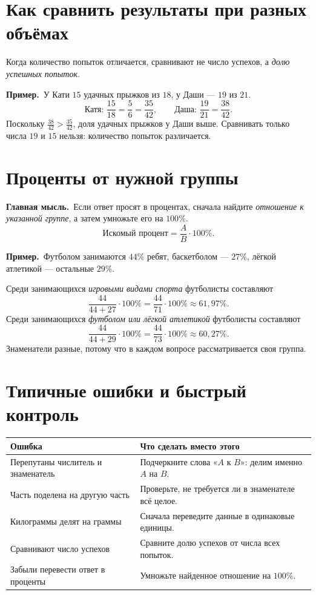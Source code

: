 \documentclass[a4paper,12pt]{article}
\newcommand{\keyidea}[1]{\textcolor{darkaccent}{\textbf{Главная мысль.}}\ #1}
\newcommand{\ex}[1]{\par\textcolor{darkaccent}{\textbf{Пример.}}\ #1}
\begin{document}
\section{Как сравнить результаты при разных объёмах}

Когда количество попыток отличается, сравнивают не число успехов, а \emph{долю успешных попыток}.

\ex{У Кати $15$ удачных прыжков из $18$, у Даши --- $19$ из $21$.}
\[
\text{Катя: }\frac{15}{18}=\frac56=\frac{35}{42},\qquad
\text{Даша: }\frac{19}{21}=\frac{38}{42}.
\]
Поскольку $\frac{38}{42}>\frac{35}{42}$, доля удачных прыжков у Даши выше. Сравнивать только числа $19$ и $15$ нельзя: количество попыток различается.

\section{Проценты от нужной группы}

\keyidea{Если ответ просят в процентах, сначала найдите \emph{отношение к указанной группе}, а затем умножьте его на $100\%$.}
\[
\boxed{\displaystyle \text{Искомый процент}=\frac{A}{B}\cdot100\%}.
\]
\ex{Футболом занимаются $44\%$ ребят, баскетболом --- $27\%$, лёгкой атлетикой --- остальные $29\%$.}

Среди занимающихся \emph{игровыми видами спорта} футболисты составляют
\[
\frac{44}{44+27}\cdot100\%=\frac{44}{71}\cdot100\%\approx61{,}97\%.
\]
Среди занимающихся \emph{футболом или лёгкой атлетикой} футболисты составляют
\[
\frac{44}{44+29}\cdot100\%=\frac{44}{73}\cdot100\%\approx60{,}27\%.
\]
Знаменатели разные, потому что в каждом вопросе рассматривается своя группа.

\section{Типичные ошибки и быстрый контроль}

\renewcommand{\arraystretch}{1.24}
\begin{tabularx}{\linewidth}{@{}p{.38\linewidth}X@{}}
\toprule
\textbf{Ошибка} & \textbf{Что сделать вместо этого}\\
\midrule
Перепутаны числитель и знаменатель & Подчеркните слова «$A$ к $B$»: делим именно $A$ на $B$.\\
Часть поделена на другую часть & Проверьте, не требуется ли в знаменателе всё целое.\\
Килограммы делят на граммы & Сначала переведите данные в одинаковые единицы.\\
Сравнивают число успехов & Сравните долю успехов от числа всех попыток.\\
Забыли перевести ответ в проценты & Умножьте найденное отношение на $100\%$.\\
\bottomrule
\end{tabularx}
\end{document}
